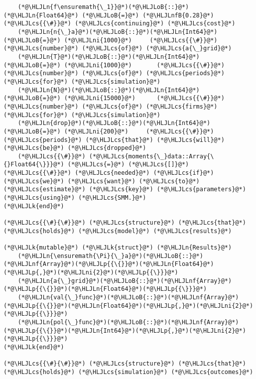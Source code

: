 \documentclass[12pt,a4paper]{article}
\newcommand{\HLJLk}[1]{\textcolor[RGB]{148,91,176}{\textbf{#1}}}
\newcommand{\HLJLn}[1]{#1}
\newcommand{\HLJLnf}[1]{\textcolor[RGB]{66,102,213}{#1}}
\newcommand{\HLJLnfB}[1]{\textcolor[RGB]{59,151,46}{#1}}
\newcommand{\HLJLni}[1]{\textcolor[RGB]{59,151,46}{#1}}
\newcommand{\HLJLoB}[1]{\textcolor[RGB]{102,102,102}{\textbf{#1}}}
\newcommand{\HLJLp}[1]{#1}
\newcommand{\HLJLcs}[1]{\textcolor[RGB]{153,153,119}{\textit{#1}}}
\begin{document}
\begin{lstlisting}
    (*@\HLJLn{f\ensuremath{\_1}}@*)(*@\HLJLoB{::}@*)(*@\HLJLn{Float64}@*) (*@\HLJLoB{=}@*) (*@\HLJLnfB{0.28}@*)    (*@\HLJLcs{{\#}}@*) (*@\HLJLcs{continuing}@*) (*@\HLJLcs{cost}@*)
    (*@\HLJLn{n{\_}a}@*)(*@\HLJLoB{::}@*)(*@\HLJLn{Int64}@*) (*@\HLJLoB{=}@*) (*@\HLJLni{1000}@*)     (*@\HLJLcs{{\#}}@*) (*@\HLJLcs{number}@*) (*@\HLJLcs{of}@*) (*@\HLJLcs{a{\_}grid}@*)
    (*@\HLJLn{T}@*)(*@\HLJLoB{::}@*)(*@\HLJLn{Int64}@*) (*@\HLJLoB{=}@*) (*@\HLJLni{1000}@*)       (*@\HLJLcs{{\#}}@*) (*@\HLJLcs{number}@*) (*@\HLJLcs{of}@*) (*@\HLJLcs{periods}@*) (*@\HLJLcs{for}@*) (*@\HLJLcs{simulation}@*)
    (*@\HLJLn{N}@*)(*@\HLJLoB{::}@*)(*@\HLJLn{Int64}@*) (*@\HLJLoB{=}@*) (*@\HLJLni{15000}@*)      (*@\HLJLcs{{\#}}@*) (*@\HLJLcs{number}@*) (*@\HLJLcs{of}@*) (*@\HLJLcs{firms}@*) (*@\HLJLcs{for}@*) (*@\HLJLcs{simulation}@*)
    (*@\HLJLn{drop}@*)(*@\HLJLoB{::}@*)(*@\HLJLn{Int64}@*) (*@\HLJLoB{=}@*) (*@\HLJLni{200}@*)     (*@\HLJLcs{{\#}}@*) (*@\HLJLcs{periods}@*) (*@\HLJLcs{that}@*) (*@\HLJLcs{will}@*) (*@\HLJLcs{be}@*) (*@\HLJLcs{dropped}@*)
    (*@\HLJLcs{{\#}}@*) (*@\HLJLcs{moments{\_}data::Array{\{}Float64{\}}}@*) (*@\HLJLcs{=}@*) (*@\HLJLcs{[]}@*) (*@\HLJLcs{{\#}}@*) (*@\HLJLcs{needed}@*) (*@\HLJLcs{if}@*) (*@\HLJLcs{we}@*) (*@\HLJLcs{want}@*) (*@\HLJLcs{to}@*) (*@\HLJLcs{estimate}@*) (*@\HLJLcs{key}@*) (*@\HLJLcs{parameters}@*) (*@\HLJLcs{using}@*) (*@\HLJLcs{SMM.}@*)
(*@\HLJLk{end}@*)

(*@\HLJLcs{{\#}{\#}}@*) (*@\HLJLcs{structure}@*) (*@\HLJLcs{that}@*) (*@\HLJLcs{holds}@*) (*@\HLJLcs{model}@*) (*@\HLJLcs{results}@*)

(*@\HLJLk{mutable}@*) (*@\HLJLk{struct}@*) (*@\HLJLn{Results}@*)
    (*@\HLJLn{\ensuremath{\Pi}{\_}a}@*)(*@\HLJLoB{::}@*)(*@\HLJLnf{Array}@*)(*@\HLJLp{{\{}}@*)(*@\HLJLn{Float64}@*)(*@\HLJLp{,}@*)(*@\HLJLni{2}@*)(*@\HLJLp{{\}}}@*)
    (*@\HLJLn{a{\_}grid}@*)(*@\HLJLoB{::}@*)(*@\HLJLnf{Array}@*)(*@\HLJLp{{\{}}@*)(*@\HLJLn{Float64}@*)(*@\HLJLp{{\}}}@*)
    (*@\HLJLn{val{\_}func}@*)(*@\HLJLoB{::}@*)(*@\HLJLnf{Array}@*)(*@\HLJLp{{\{}}@*)(*@\HLJLn{Float64}@*)(*@\HLJLp{,}@*)(*@\HLJLni{2}@*)(*@\HLJLp{{\}}}@*)
    (*@\HLJLn{pol{\_}func}@*)(*@\HLJLoB{::}@*)(*@\HLJLnf{Array}@*)(*@\HLJLp{{\{}}@*)(*@\HLJLn{Int64}@*)(*@\HLJLp{,}@*)(*@\HLJLni{2}@*)(*@\HLJLp{{\}}}@*)
(*@\HLJLk{end}@*)

(*@\HLJLcs{{\#}{\#}}@*) (*@\HLJLcs{structure}@*) (*@\HLJLcs{that}@*) (*@\HLJLcs{holds}@*) (*@\HLJLcs{simulation}@*) (*@\HLJLcs{outcomes}@*)


\end{lstlisting}
\end{document}
